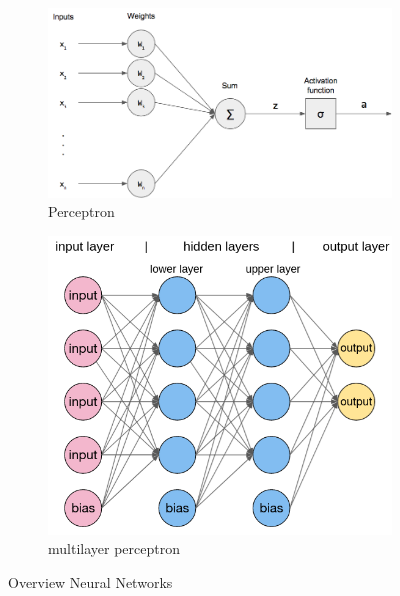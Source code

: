 \begin{figure}
    \begin{subfigure}{0.45\textwidth}
      \includegraphics[width=\linewidth]{images/perceptron.png}
      \caption{Perceptron} \label{fig:perceptron}
    \end{subfigure}%
    \hspace*{\fill}   %
    \begin{subfigure}{0.45\textwidth}
      \includegraphics[width=\linewidth]{images/mlp.png}
      \caption{multilayer perceptron} \label{fig:mlp}
    \end{subfigure}%
    \hspace*{\fill}   %
  \caption{Overview Neural Networks} \label{fig:NN_Overview}
\end{figure}


